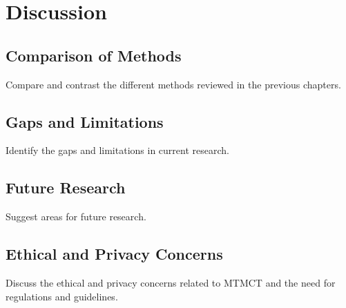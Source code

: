 \chapter{Discussion}\label{chap:discussion}

\section{Comparison of Methods}\label{sec:comparison_of_methods}
Compare and contrast the different methods reviewed in the previous chapters.

\section{Gaps and Limitations}\label{sec:gaps_and_limitations}
Identify the gaps and limitations in current research.

\section{Future Research}\label{sec:future_research}
Suggest areas for future research.

\section{Ethical and Privacy Concerns}\label{sec:ethical_and_privacy_concerns}
Discuss the ethical and privacy concerns related to MTMCT and the need for regulations and guidelines.
